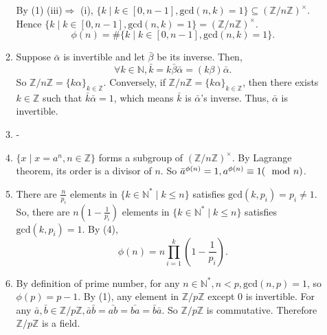 \documentclass[12pt]{article}
\newcommand{\NN}{\mathbb{N}}
\newcommand{\ZZ}{\mathbb{Z}}
\begin{document}
\begin{enumerate}
\begin{enumerate}
                    \newline
                    By (1) (iii)$\Rightarrow$ (i), $\{k\mid k\in [0,n-1],\mathrm{gcd}(n,k)=1\}\subseteq (\ZZ/n\ZZ)^\times$.
                    \newline Hence $\{k\mid k\in [0,n-1],\mathrm{gcd}(n,k)=1\}=(\ZZ/n\ZZ)^\times$. 
                    $$\phi(n)=\#\{k\mid k\in [0,n-1],\mathrm{gcd}(n,k)=1\}.$$
                \item  Suppose $\bar{\alpha}$ is invertible and let $\bar{\beta}$ be its inverse. Then, 
                    $$\forall k\in \NN, \bar{k}=k\bar{\beta}\bar{\alpha}=(k\beta)\bar{\alpha}.$$
                    So $\ZZ/n\ZZ=\{k\alpha\}_{k\in\ZZ}$.
                    \newline
                    Conversely, if $\ZZ/n\ZZ=\{k\alpha\}_{k\in\ZZ}$, then there exists $k\in\ZZ$ such that $\bar{k}\bar{\alpha}=1$, which means $\bar{k}$ is $\bar{\alpha}$'s inverse. Thus, $\bar{\alpha}$ is invertible.
                \item -
                \item $\{x\mid x=a^n,n\in\ZZ\}$ forms a subgroup of $(\ZZ/n\ZZ)^\times$. By Lagrange theorem, its order is a divisor of $n$. So $\bar{a}^{\phi(n)}=1, a^{\phi(n)}\equiv 1 (\mathrm{\mod} n )$.
                \item There are $\frac{n}{p_i}$ elements in $\{k\in\NN^{*}\mid k\le n\}$ satisfies $\mathrm{gcd}(k,p_i)=p_i\not=1$. So, there are $n(1-\frac{1}{p_i})$ elements in $\{k\in\NN^{*}\mid k\le n\}$ satisfies $\mathrm{gcd}(k,p_i)=1$. By (4),
                    $$\phi(n)=n\prod_{i=1}^{k}(1-\frac{1}{p_i}).$$
                \item By definition of prime number, for any $n\in \NN^{*}, n<p, \mathrm{gcd}(n,p)=1$, so $\phi(p)=p-1.$ By (1), any element in $\ZZ/p\ZZ$ except $0$ is invertible. For any $\bar{a},\bar{b}\in \ZZ/p\ZZ, \bar{a}\bar{b}=\bar{ab}=\bar{ba}=\bar{b}\bar{a}.$ So $\ZZ/p\ZZ$ is commutative. Therefore $\ZZ/p\ZZ$ is a field. 
        \end{enumerate}
\end{enumerate}
\end{document}
